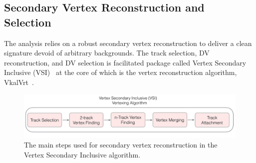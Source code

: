 \subsection{Secondary Vertex Reconstruction and Selection}
The analysis relies on a robust secondary vertex reconstruction to deliver a clean signature devoid of arbitrary backgrounds. The track selection, DV reconstruction, and DV selection is facilitated package called Vertex Secondary Inclusive (VSI)~\cite{ATL-PHYS-PUB-2019-013} at the core of which is the vertex reconstruction algorithm, VkalVrt~\cite{Kostyukhin:685551}.

\begin{figure}[!ht]
    \centering
    \includegraphics[width=0.8\linewidth]{figures//analysis_overview/vertexing/VSIalg.png}
    \caption{The main steps used for secondary vertex reconstruction in the Vertex Secondary Inclusive algorithm.~\cite{ATL-PHYS-PUB-2019-013}}
    \label{fig:vsi-steps}
\end{figure}

